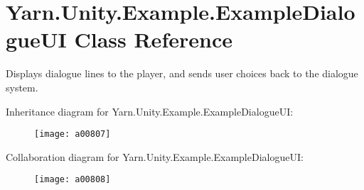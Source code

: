 \hypertarget{a00103}{\section{Yarn.\-Unity.\-Example.\-Example\-Dialogue\-U\-I Class Reference}
\label{a00103}
}


Displays dialogue lines to the player, and sends user choices back to the dialogue system.  




Inheritance diagram for Yarn.\-Unity.\-Example.\-Example\-Dialogue\-U\-I\-:
\nopagebreak
\begin{figure}[H]
\begin{center}
\leavevmode
\texttt{[image: a00807]}
\end{center}
\end{figure}


Collaboration diagram for Yarn.\-Unity.\-Example.\-Example\-Dialogue\-U\-I\-:
\nopagebreak
\begin{figure}[H]
\begin{center}
\leavevmode
\texttt{[image: a00808]}
\end{center}
\end{figure}
